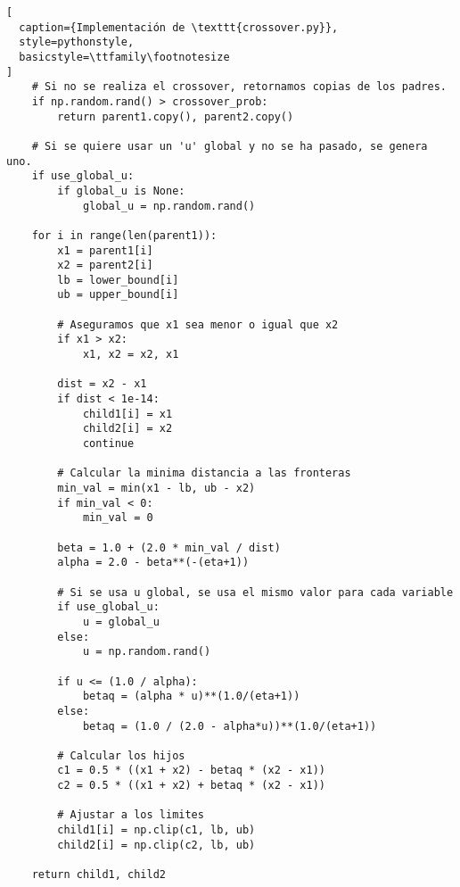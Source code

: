 \begin{lstlisting}[
  caption={Implementación de \texttt{crossover.py}},
  style=pythonstyle,
  basicstyle=\ttfamily\footnotesize
]
    # Si no se realiza el crossover, retornamos copias de los padres.
    if np.random.rand() > crossover_prob:
        return parent1.copy(), parent2.copy()
    
    # Si se quiere usar un 'u' global y no se ha pasado, se genera uno.
    if use_global_u:
        if global_u is None:
            global_u = np.random.rand()
    
    for i in range(len(parent1)):
        x1 = parent1[i]
        x2 = parent2[i]
        lb = lower_bound[i]
        ub = upper_bound[i]
        
        # Aseguramos que x1 sea menor o igual que x2
        if x1 > x2:
            x1, x2 = x2, x1
        
        dist = x2 - x1
        if dist < 1e-14:
            child1[i] = x1
            child2[i] = x2
            continue
        
        # Calcular la minima distancia a las fronteras
        min_val = min(x1 - lb, ub - x2)
        if min_val < 0:
            min_val = 0
        
        beta = 1.0 + (2.0 * min_val / dist)
        alpha = 2.0 - beta**(-(eta+1))
        
        # Si se usa u global, se usa el mismo valor para cada variable
        if use_global_u:
            u = global_u
        else:
            u = np.random.rand()
        
        if u <= (1.0 / alpha):
            betaq = (alpha * u)**(1.0/(eta+1))
        else:
            betaq = (1.0 / (2.0 - alpha*u))**(1.0/(eta+1))
        
        # Calcular los hijos
        c1 = 0.5 * ((x1 + x2) - betaq * (x2 - x1))
        c2 = 0.5 * ((x1 + x2) + betaq * (x2 - x1))
        
        # Ajustar a los limites
        child1[i] = np.clip(c1, lb, ub)
        child2[i] = np.clip(c2, lb, ub)
    
    return child1, child2
\end{lstlisting}

